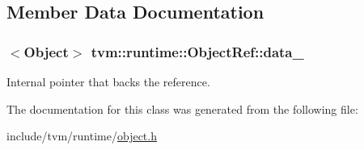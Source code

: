 \subsection{Member Data Documentation}
\subsubsection[{\texorpdfstring{data\+\_\+}{data_}}]{$<${\bf Object}$>$ tvm\+::runtime\+::\+Object\+Ref\+::data\+\_\+\hspace{0.3cm}{\ttfamily [protected]}}\hypertarget{classtvm_1_1runtime_1_1ObjectRef_ac261cdb80487fb29ac42b28678f8cbef}{}\label{classtvm_1_1runtime_1_1ObjectRef_ac261cdb80487fb29ac42b28678f8cbef}


Internal pointer that backs the reference. 



The documentation for this class was generated from the following file\+:\begin{DoxyCompactItemize}
\item 
include/tvm/runtime/\hyperlink{object_8h}{object.\+h}\end{DoxyCompactItemize}
